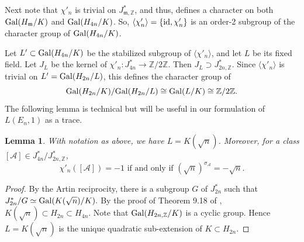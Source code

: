 \documentclass[11pt, reqno]{amsart}
\theoremstyle{plain}
\newtheorem{lemma}[theorem]{Lemma}
\theoremstyle{definition}
\numberwithin{equation}{section}
\begin{document}

Next note  that $\chi'_{n}$ is trivial on $J_{\mathfrak{m},\mathbb{Z}}^{*}$, and thus, defines a character on both ${\rm Gal}(H_{\mathfrak{m}}/K)$ and ${\rm Gal}(H_{4n}/K)$. So, $\langle\chi'_{n}\rangle=\{{\rm id}, \chi'_{n}\}$ is an order-2 subgroup of the character group of ${\rm Gal}(H_{4n}/K)$. 

Let $L'\subset {\rm Gal}(H_{4n}/K)$ be the stabilized subgroup of $\langle\chi'_{n}\rangle$, and let $L$ be its fixed field. Let $J_L$ be the kernel of $\chi'_n:J_{4n}^* \longrightarrow \mathbb{Z}/2\mathbb{Z}$.  Then $J_L\supset J_{2n,\mathbb{Z}}^*$. Since $\langle\chi'_{n}\rangle$ is trivial on $L'={\rm Gal}(H_{2n}/L)$,  this defines the character group of 
$$
{\rm Gal}(H_{2n}/K)/{\rm Gal}(H_{2n}/L)\cong {\rm Gal}(L/K)\cong \mathbb{Z}/2\mathbb{Z}.
$$
The following lemma is technical but will be useful in our formulation of $L(E_{n},1)$ as a trace.
\begin{lemma}\label{lemchip}
With notation as above, we have $L=K(\sqrt{n})$.  Moreover,  for a class $[\mathcal{A}]\in J_{4n}^{*}/J_{2n,\mathbb{Z}}^{*}$, 
    $$
    \mbox{$\chi'_{n}([\mathcal{A}])=-1$  if and only if $(\sqrt{n})^{\sigma_{\mathcal{A}}}=-\sqrt{n}$.}
    $$
\end{lemma}


\begin{proof}
    By the Artin reciprocity, there
is a subgroup  $G$ of $J_{2n}^{*}$ such that 
$J_{2n}^{*}/G \simeq {\rm Gal}(K(\sqrt{n})/K).
$
By the proof of Theorem 9.18 of \cite{Cox}, $K(\sqrt{n})\subset H_{2n}\subset H_{4n}$.  Note that 
${\rm Gal}(H_{2n,\mathbb{Z}}/K)$
 is a cyclic group. Hence $L=K(\sqrt{n})$ is the unique quadratic sub-extension
  of $K\subset H_{2n}$. 
\end{proof}
\end{document}
